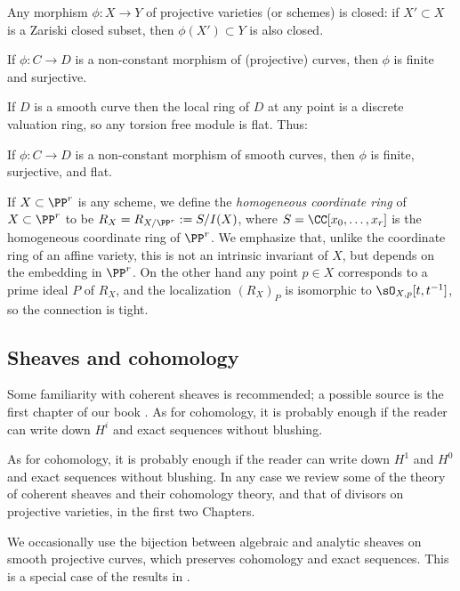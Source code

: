 \begin{theorem}
 Any morphism $\phi: X\to Y$ of projective varieties (or schemes) is closed: if $X'\subset X$ is a Zariski closed subset,
 then $\phi(X') \subset Y$ is also closed.
\end{theorem}

\begin{corollary}
If $\phi: C\to D$ is a non-constant morphism of (projective) curves, then $\phi$ is finite and surjective. 
\end{corollary}

If $D$ is a 
smooth curve then the local ring of $D$ at any point is a discrete valuation ring, so any torsion free module is flat. 
Thus:

\begin{proposition}
If $\phi: C\to D$ is a non-constant morphism of smooth curves, then $\phi$ is finite, surjective, and flat.
\end{proposition}

If $X\subset \PP^{r}$ is any scheme, we define the \emph{homogeneous coordinate ring} of $X\subset \PP^{r}$
to be $R_{X} = R_{X/\PP^{r}}:= S/I(X)$, where $S =\CC[x_{0}, \dots, x_{r}]$ is the homogeneous coordinate ring of $\PP^{r}$. We emphasize
that, unlike the coordinate ring of an affine variety, this is not an intrinsic invariant of $X$, but depends on the 
embedding in $\PP^{r}$. On the other hand any point $p\in X$ corresponds to a prime ideal $P$ of $R_{X}$, 
and the localization $(R_{X})_{P}$ is isomorphic to $\sO_{X,p}[t,t^{-1}]$, so the connection is tight.

\subsection {Sheaves and cohomology} 

Some familiarity with coherent sheaves is recommended; a possible source is
the first chapter of our book \cite{GeomSchemes}.
As for cohomology, it is probably enough if the reader can write down $H^i$ and exact sequences without blushing.

As for cohomology, it is probably enough if the reader can write down $H^1$ and $H^0$ and exact sequences without blushing.
In any case we review some of the theory of coherent sheaves and their cohomology theory, and that of divisors on projective 
varieties, in the first two Chapters. 

We occasionally use the bijection between algebraic and analytic sheaves on smooth projective curves, which preserves
cohomology and exact sequences. This is a special case of the results in \cite{GAGA}. 

